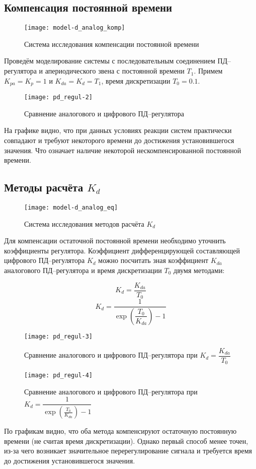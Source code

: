         \subsection{Компенсация постоянной времени}
            \begin{figure}[H]
                \centering\texttt{[image: model-d\_analog\_komp]}
                \caption{Система исследования компенсации постоянной времени}
            \end{figure}
            Проведём моделирование системы с последовательным соединением ПД--регулятора и апериодического звена с постоянной времени $ T_1 $. Примем $ K_{pa}=K_p=1 $ и $ K_{da} = K_d = T_1 $, время дискретизации $ T_0 = 0.1$.
            \begin{figure}[H]
                \centering\texttt{[image: pd\_regul-2]}
                \caption{Сравнение аналогового и цифрового ПД--регулятора}
            \end{figure}
            На графике видно, что при данных условиях реакции систем практически совпадают и требуют некоторого времени до достижения установившегося значения. Что означает наличие некоторой нескомпенсированной постоянной времени.

        \subsection{Методы расчёта $ K_d $}
            \begin{figure}[H]
                \centering\texttt{[image: model-d\_analog\_eq]}
                \caption{Система исследования методов расчёта $ K_d $}
            \end{figure}
            Для компенсации остаточной постоянной времени необходимо уточнить коэффициенты регулятора.
            Коэффициент дифференцирующей составляющей цифрового ПД--регулятора $ K_d $ можно посчитать зная коэффициент $ K_{da} $ аналогового ПД--регулятора и время дискретизации $ T_0 $ двумя методами:
            
            $$  K_d = \dfrac{K_{da}}{T_0}  $$ 
            $$  K_d = \dfrac{1}{\exp\left(\dfrac{T_0}{K_{da}}\right)-1}  $$
            \begin{figure}[H]
                \centering\texttt{[image: pd\_regul-3]}
                \caption{Сравнение аналогового и цифрового ПД--регулятора при $ K_d = \dfrac{K_{da}}{T_0} $}
            \end{figure}
            \begin{figure}[H]
                \centering\texttt{[image: pd\_regul-4]}
                \caption{Сравнение аналогового и цифрового ПД--регулятора при $ K_d = \dfrac{1}{\exp\left(\frac{T_0}{K_{da}}\right)-1} $}
            \end{figure}
            По графикам видно, что оба метода компенсируют остаточную постоянную времени (не считая время дискретизации). Однако первый способ менее точен, из-за чего возникает значительное перерегулирование сигнала и требуется время до достижения установившегося значения.
            
